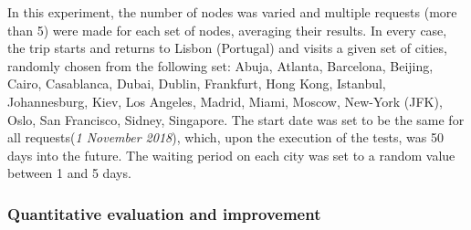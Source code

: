 \documentclass[onecolumn]{elsarticle}
\begin{document}
In this experiment, the number of nodes was varied and multiple requests (more than 5) were made for each set of nodes, averaging their results. In every case, the trip starts and returns to Lisbon (Portugal) and visits a given set of cities, randomly chosen from the following set: Abuja, Atlanta, Barcelona, Beijing, Cairo, Casablanca, Dubai, Dublin, Frankfurt, Hong Kong, Istanbul, Johannesburg, Kiev, Los Angeles, Madrid, Miami, Moscow, New-York (JFK), Oslo, San Francisco, Sidney, Singapore. The start date was set to be the same for all requests(\textit{1 November 2018}), which, upon the execution of the tests, was 50 days into the future. The waiting period on each city was set to a random value between 1 and 5 days. 


\subsubsection{Quantitative evaluation and improvement}
\end{document}
